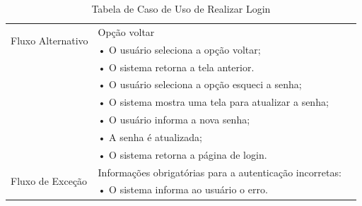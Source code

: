 \documentclass[a4paper,12pt]{article}
\begin{document}
\begin{table}[ht]
\begin{tabular}{|p{3.5cm}|p{10cm}|p{7cm}|}
        \multirow{2}{*}{Fluxo Alternativo}
                                        & Opção voltar                                                                     \\
                                        & • O usuário seleciona a opção voltar;                                            \\
                                        & • O sistema retorna a tela anterior.                                             \\
                                        & • O usuário seleciona a opção esqueci a senha;                                   \\
                                        & • O sistema mostra uma tela para atualizar a senha;                              \\
                                        & • O usuário informa a nova senha;                                                \\
                                        & • A senha é atualizada;                                                          \\
                                        & • O sistema retorna a página de login.                                           \\
        \hline
        \multirow{2}{*}{Fluxo de Exceção}
                                        & Informações obrigatórias para a autenticação incorretas:                         \\
                                        & • O sistema informa ao usuário o erro.                                           \\
        \hline
    \end{tabular}
    \caption{Tabela de Caso de Uso de Realizar Login}
    \label{tab:casos-de-uso}
\end{table}
\end{document}
